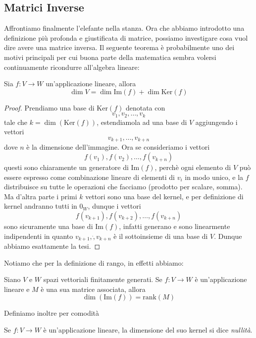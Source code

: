 \documentclass[11pt]{scrartcl}
\newcommand{\Immagine}[1]{\text{Im}\left(#1\right)}
\renewcommand{\ker}[1]{\text{Ker}\left(#1\right)}
\begin{document}
  	 \newpage
  	 
  	 \subsection{Matrici Inverse}
  	 Affrontiamo finalmente l'elefante nella stanza. Ora che abbiamo introdotto una definizione più profonda e giustificata di matrice, possiamo investigare cosa vuol dire avere una matrice inversa. Il seguente teorema è probabilmente uno dei motivi principali per cui buona parte della matematica sembra volersi continuamente ricondurre all'algebra lineare:
  	 \begin{lemma}\label{rango-nullità}
  	 	Sia $f:V\to W$ un'applicazione lineare, allora 
  	 	$$\dim V=\dim\Immagine{f}+\dim\ker{f}$$
  	 \end{lemma}
  	 \begin{proof}
  	 	Prendiamo una base di $\ker{f}$ denotata con 
  	 	$$v_1,v_2,\dots,v_k$$ 
  	 	tale che $k=\dim(\ker{f})$, estendiamola ad una base di $V$ aggiungendo i vettori
  	 	$$v_{k+1},\dots,v_{k+n}$$
  	 	dove $n$ è la dimensione dell'immagine. Ora se consideriamo i vettori 
  	 	$$f(v_1),f(v_2),\dots,f(v_{k+n})$$
  	 	questi sono chiaramente un generatore di $\Immagine{f}$, perchè ogni elemento di $V$ può essere espresso come combinazione lineare di elementi di $v_i$ in modo unico, e la $f$ distribuisce su tutte le operazioni che facciamo (prodotto per scalare, somma). Ma d'altra parte i primi $k$ vettori sono una base del kernel, e per definizione di kernel andranno tutti in $0_W$, dunque i vettori
  	 	$$f(v_{k+1}),f(v_{k+2}),\dots,f(v_{k+n})$$
  	 	sono sicuramente una base di $\Immagine{f}$, infatti generano e sono linearmente indipendenti in quanto $v_{k+1},\dot,v_{k+n}$ è il sottoinsieme di una base di $V$. Dunque abbiamo esattamente la tesi. 
  	 \end{proof}
  	 Notiamo che per la definizione di rango, in effetti abbiamo:
  	 \begin{proposition}
  	 	Siano $V$ e $W$ spazi vettoriali finitamente generati. Se $f:V\to W$ è un'applicazione lineare e $M$ è una sua matrice associata, allora
  	 	$$\dim(\Immagine{f})=\text{rank}(M)$$
  	 \end{proposition}
  	 Definiamo inoltre per comodità
  	 \begin{definition}[Nullità]
  	 	Se $f:V\to W$ è un'applicazione lineare, la dimensione del suo kernel si dice \textit{nullità}.
  	 \end{definition}
\end{document}
